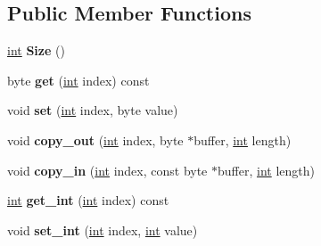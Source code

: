 \subsection*{Public Member Functions}
\begin{DoxyCompactItemize}
\item 
\mbox{\label{classv8_1_1internal_1_1ByteArray_a738020faf50daf7fb95d4d0ef9fc8731}} 
\mbox{\hyperlink{classint}{int}} {\bfseries Size} ()
\item 
\mbox{\label{classv8_1_1internal_1_1ByteArray_af86965e0713d74beb719b2e913aafda0}} 
byte {\bfseries get} (\mbox{\hyperlink{classint}{int}} index) const
\item 
\mbox{\label{classv8_1_1internal_1_1ByteArray_ad008d43b0348efd99a740d495808ad6c}} 
void {\bfseries set} (\mbox{\hyperlink{classint}{int}} index, byte value)
\item 
\mbox{\label{classv8_1_1internal_1_1ByteArray_a325c12a21b6e31f4afcd2d5d2943d7c6}} 
void {\bfseries copy\+\_\+out} (\mbox{\hyperlink{classint}{int}} index, byte $\ast$buffer, \mbox{\hyperlink{classint}{int}} length)
\item 
\mbox{\label{classv8_1_1internal_1_1ByteArray_ab0169c807cef60b07795995a53ea6cea}} 
void {\bfseries copy\+\_\+in} (\mbox{\hyperlink{classint}{int}} index, const byte $\ast$buffer, \mbox{\hyperlink{classint}{int}} length)
\item 
\mbox{\label{classv8_1_1internal_1_1ByteArray_ace5f364d5045ef543d874fea310f2a4c}} 
\mbox{\hyperlink{classint}{int}} {\bfseries get\+\_\+int} (\mbox{\hyperlink{classint}{int}} index) const
\item 
\mbox{\label{classv8_1_1internal_1_1ByteArray_a73957a07e9d9560fb74798abaedf01c6}} 
void {\bfseries set\+\_\+int} (\mbox{\hyperlink{classint}{int}} index, \mbox{\hyperlink{classint}{int}} value)
\item 
\mbox{\label{classv8_1_1internal_1_1ByteArray_a31a7e898bb9180f7431c0c4170796278}} 

\end{DoxyCompactItemize}
